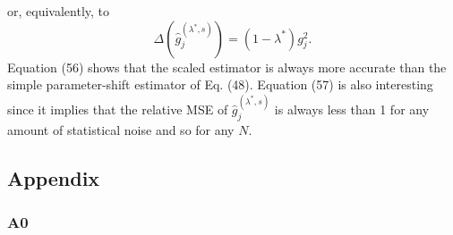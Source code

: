 or, equivalently, to
\begin{equation}
    \Delta\left(\hat{g}_j^{\left(\lambda^*, s\right)}\right)=\left(1-\lambda^*\right) g_j^2 .
\end{equation}
Equation (56) shows that the scaled estimator is always more accurate than the simple parameter-shift estimator of Eq. (48). Equation (57) is also interesting since it implies that the relative MSE of $\hat{g}_j^{\left(\lambda^*, s\right)}$ is always less than 1 for any amount of statistical noise and so for any $N$.

\subsection{Appendix}

\subsubsection{A0}\label{app:a0}

